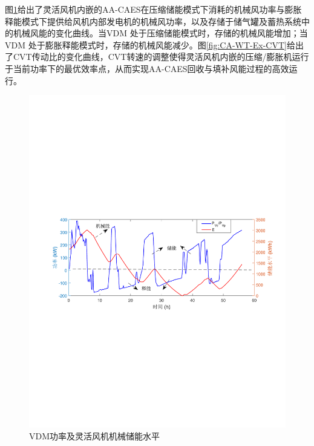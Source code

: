 图\ref{fig:CA-WT-Ex-AirTank}给出了灵活风机内嵌的AA-CAES在压缩储能模式下消耗的机械风功率与膨胀释能模式下提供给风机内部发电机的机械风功率，以及存储于储气罐及蓄热系统中的机械风能的变化曲线。当VDM 处于压缩储能模式时，存储的机械风能增加；当VDM 处于膨胀释能模式时，存储的机械风能减少。图\ref{fig:CA-WT-Ex-CVT}给出了CVT传动比的变化曲线，CVT转速的调整使得灵活风机内嵌的压缩/膨胀机运行于当前功率下的最优效率点，从而实现AA-CAES回收与填补风能过程的高效运行。

\begin{figure}[H] %
  \centering
  \includegraphics[scale=0.64]{figures/Chap5-15-CA-WT-Ex-AirTank.pdf}
  \caption{VDM功率及灵活风机机械储能水平}
  \label{fig:CA-WT-Ex-AirTank}
\end{figure}

